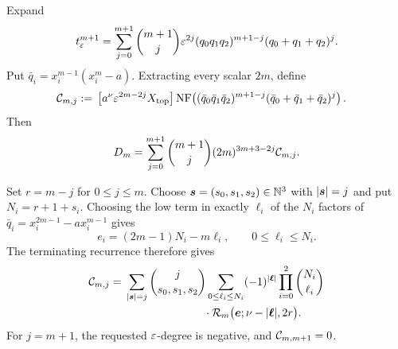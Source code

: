 \documentclass[11pt]{article}
\theoremstyle{definition}
\theoremstyle{remark}
\begin{document}
Expand
\begin{equation}
t_\varepsilon^{m+1}
=\sum_{j=0}^{m+1}\binom{m+1}{j}\varepsilon^{2j}
(q_0q_1q_2)^{m+1-j}(q_0+q_1+q_2)^j.
\label{eq:t-power-expansion}
\end{equation}
Put \(\bar q_i=x_i^{m-1}(x_i^m-a)\).  Extracting every scalar \(2m\),
define
\begin{equation}
\begin{aligned}
\mathcal{C}_{m,j}:={}&
\left[a^\nu\varepsilon^{2m-2j}X_{\mathrm{top}}\right]\operatorname{NF}\!\left(
(\bar q_0\bar q_1\bar q_2)^{m+1-j}
(\bar q_0+\bar q_1+\bar q_2)^j
\right).
\end{aligned}
\label{eq:C-precollapse}
\end{equation}
Then
\begin{equation}
D_m=\sum_{j=0}^{m+1}\binom{m+1}{j}
(2m)^{3m+3-2j}\mathcal{C}_{m,j}.
\label{eq:D-precollapse}
\end{equation}

Set \(r=m-j\) for \(0\le j\le m\).  Choose
\(\boldsymbol{s}=(s_0,s_1,s_2)\in\mathbb{N}^3\) with \(|\boldsymbol{s}|=j\) and put
\(N_i=r+1+s_i\).  Choosing the low term in exactly \(\ell_i\) of the
\(N_i\) factors of
\(\bar q_i=x_i^{2m-1}-a x_i^{m-1}\) gives
\[
e_i=(2m-1)N_i-m\ell_i,
\qquad 0\le\ell_i\le N_i.
\]
The terminating recurrence therefore gives
\begin{equation}
\begin{aligned}
\cC_{m,j}
={}&\sum_{|\bs|=j}\binom{j}{s_0,s_1,s_2}
\sum_{0\le\ell_i\le N_i}
(-1)^{|\bell|}\prod_{i=0}^2\binom{N_i}{\ell_i}\\
&\hspace{25mm}\cdot
\cR_m\bigl(\be;\vnu-|\bell|,2r\bigr).
\end{aligned}
\label{eq:C-recurrence-certificate}
\end{equation}
For \(j=m+1\), the requested \(\varepsilon\)-degree is negative, and
\(\mathcal{C}_{m,m+1}=0\).
\end{document}
